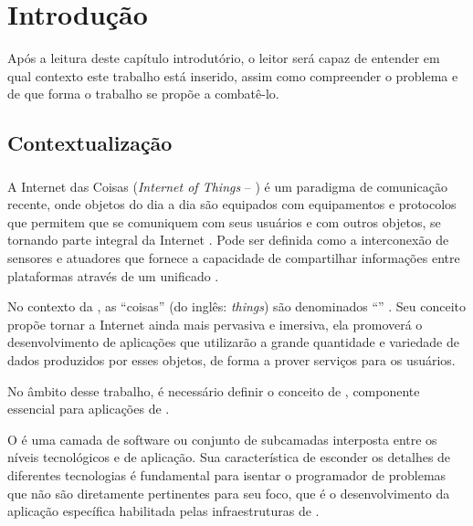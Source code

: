 \chapter{Introdução}

Após a leitura deste capítulo introdutório, o leitor será capaz de entender em qual contexto este trabalho está inserido, assim como compreender o problema e de que forma o trabalho se propõe a combatê-lo.

\section{Contextualização}

\subsection{\iot}

A Internet das Coisas (\textit{Internet of Things} -- \iot) é um paradigma de comunicação recente, onde objetos do dia a dia são equipados com equipamentos e protocolos que permitem que se comuniquem com seus usuários e com outros objetos, se tornando parte integral da Internet \cite{atzori:iera:morabito:2010}.  Pode ser definida como a interconexão de sensores e atuadores que fornece a capacidade de compartilhar informações entre plataformas através de um \framework unificado \cite{gubbi:et-al:2013}.

No contexto da \iot, as ``coisas'' (do inglês: \textit{things}) são denominados ``\smartobjs'' \cite{bandyopadhyay:sen:2011}. Seu conceito propõe tornar a Internet ainda mais pervasiva e imersiva, ela promoverá o desenvolvimento de aplicações que utilizarão a grande quantidade e variedade de dados produzidos por esses objetos, de forma a prover serviços para os usuários. 


No âmbito desse trabalho, é necessário definir o conceito de \middleware, componente essencial para aplicações de \iot.
\begin{citacao}
	O \middleware é uma camada de software ou conjunto de subcamadas interposta entre os níveis tecnológicos e de aplicação. Sua característica de esconder os detalhes de diferentes tecnologias é fundamental para isentar o programador de problemas que não são diretamente pertinentes para seu foco, que é o desenvolvimento da aplicação específica habilitada pelas infraestruturas de \iot \cite[tradução~nossa]{atzori:iera:morabito:2010}.
\end{citacao}

